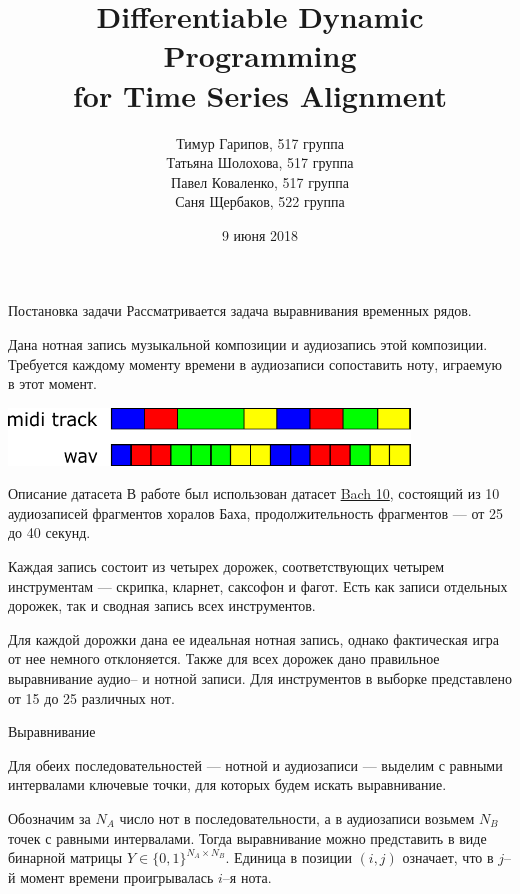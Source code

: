 \documentclass[unicode, dvipsnames]{beamer}
\title[Time Series Alignment]{Differentiable Dynamic Programming \\ for Time Series Alignment}
\author[]{Тимур Гарипов, 517 группа \\ Татьяна Шолохова, 517 группа \\ Павел Коваленко, 517 группа \\ Саня Щербаков, 522 группа}
\date{9 июня 2018}
\begin{document}
\begin{frame}
    \titlepage
\end{frame}

\begin{frame}{Постановка задачи}
	Рассматривается задача выравнивания временных рядов.
	
	\bigskip
	Дана нотная запись музыкальной композиции и аудиозапись этой композиции. Требуется каждому моменту времени в аудиозаписи сопоставить ноту, играемую в этот момент.
	
	\bigskip
	\centering
	\includegraphics[width=0.8\textwidth]{graphics/task.pdf}
\end{frame}

\begin{frame}{Описание датасета}
В работе был использован датасет \href{http://music.cs.northwestern.edu/data/Bach10.html}{Bach 10}, состоящий из 10 аудиозаписей фрагментов хоралов Баха, продолжительность фрагментов --- от 25 до 40 секунд. 

\bigskip
Каждая запись состоит из четырех дорожек, соответствующих четырем инструментам --- скрипка, кларнет, саксофон и фагот. Есть как записи отдельных дорожек, так и сводная запись всех инструментов.

\bigskip
Для каждой дорожки дана ее идеальная нотная запись, однако фактическая игра от нее немного отклоняется. Также для всех дорожек дано правильное выравнивание аудио-- и нотной записи. Для инструментов в выборке представлено от 15 до 25 различных нот.

\end{frame}

\begin{frame}{Выравнивание}

Для обеих последовательностей --- нотной и аудиозаписи --- выделим с равными интервалами ключевые точки, для которых будем искать выравнивание.

\bigskip
Обозначим за $N_A$ число нот в последовательности, а в аудиозаписи возьмем $N_B$ точек с равными интервалами. Тогда выравнивание можно представить в виде бинарной матрицы $Y \in \{0, 1\}^{N_A \times N_B}$. Единица в позиции $(i, j)$ означает, что в $j$--й момент времени проигрывалась $i$--я нота.

\end{frame}
\end{document}
